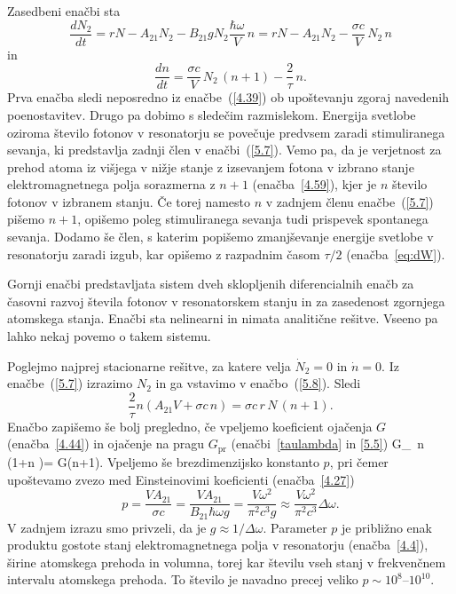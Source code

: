 Zasedbeni enačbi sta
\begin{equation}
\frac{dN_2}{dt}=rN-A_{21}N_2-B_{21}gN_2\frac{\hbar \omega}{V}\,n
=rN-A_{21}N_2-\frac{\sigma c}{V}\, N_2\,n
\label{5.7}
\end{equation}
in 
\begin{equation}
\frac{dn}{dt}=\frac{\sigma c}{V}\, N_2\,(n+1)-\frac{2}{\tau}\,n.
\label{5.8}
\end{equation}
Prva enačba sledi neposredno iz enačbe~(\ref{4.39}) ob upoštevanju zgoraj navedenih
poenostavitev. Drugo pa dobimo s sledečim razmislekom. Energija svetlobe 
oziroma število fotonov v resonatorju se povečuje predvsem 
zaradi stimuliranega sevanja, ki predstavlja zadnji člen v enačbi~(\ref{5.7}).
Vemo pa, da je verjetnost za prehod atoma iz višjega v nižje stanje z 
izsevanjem fotona v izbrano stanje elektromagnetnega polja sorazmerna z 
$n+1$ (enačba~\ref{4.59}), kjer je $n$ število fotonov v izbranem stanju. 
Če torej namesto $n$ v zadnjem členu enačbe~(\ref{5.7}) pišemo $n+1$, 
opišemo poleg stimuliranega sevanja tudi prispevek spontanega sevanja. Dodamo še 
člen, s katerim popišemo zmanjševanje energije svetlobe v resonatorju zaradi 
izgub, kar opišemo z razpadnim časom $\tau/2$ (enačba~\ref{eq:dW}). 

Gornji enačbi predstavljata sistem dveh sklopljenih diferencialnih enačb za 
časovni razvoj števila fotonov v resonatorskem stanju in za zasedenost 
zgornjega atomskega stanja. Enačbi sta nelinearni in nimata  
analitične rešitve. Vseeno pa lahko nekaj povemo o takem sistemu.

Poglejmo najprej stacionarne rešitve, za katere velja $\dot{N}_{2}=0$ in 
$\dot{n}=0$. Iz enačbe~(\ref{5.7}) izrazimo $N_{2}$ in ga vstavimo v enačbo~(\ref{5.8}).
Sledi 
\begin{equation}
\frac{2}{\tau }n\left(A_{21}V+\sigma c\,n\right)=
\sigma c\, r\,N\,(n+1).
\label{5.9}
\end{equation}
Enačbo zapišemo še bolj pregledno, če vpeljemo koeficient ojačenja $G$ (enačba~\ref{4.44})
in ojačenje na pragu $G_\mathrm{pr}$ (enačbi~\ref{taulambda} in \ref{5.5})
\beq
G_\, n\, \left(1+n \right)= G(n+1).
\label{5.9.a}
\eeq
Vpeljemo še brezdimenzijsko konstanto $p$, pri čemer upoštevamo zvezo
med Einsteinovimi koeficienti (enačba~\ref{4.27})
\begin{equation}
p=\frac{VA_{21}}{\sigma c} = 
\frac{VA_{21}}{B_{21}\hbar \omega g}=\frac{V\omega ^{2}}{\pi
^{2}c^{3}g}\approx
\frac{V\omega ^{2}}{\pi ^{2}c^{3}}\Delta \omega.  
\label{5.10}
\end{equation}
V zadnjem izrazu smo privzeli, da je $g\approx 1/\Delta \omega $. 
Parameter $p$ je približno enak produktu 
gostote stanj elektromagnetnega polja v resonatorju (enačba~\ref{4.4}),
širine atomskega prehoda in volumna, torej kar številu vseh stanj 
v frekvenčnem intervalu atomskega prehoda. To število je navadno precej 
veliko $p \sim 10^{8}$--$10^{10}$. 

